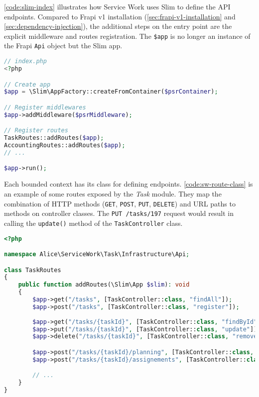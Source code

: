 \autoref{code:slim-index} illustrates how Service Work uses Slim to define the API endpoints. Compared to Frapi v1 installation (\autoref{sec:frapi-v1-installation} and \autoref{sec:dependency-injection}), the additional steps on the entry point are the explicit middleware and routes registration. The \texttt{\$app} is no longer an instance of the Frapi \texttt{Api} object but the Slim app.

\begin{lstlisting}[language=PHP,label={code:slim-index},caption={API entry point script without Frapi.}]
// index.php
<?php

// Create app
$app = \Slim\AppFactory::createFromContainer($psrContainer);

// Register middlewares
$app->addMiddleware($psrMiddleware);

// Register routes
TaskRoutes::addRoutes($app);
AccountingRoutes::addRoutes($app);
// ...

$app->run();
\end{lstlisting}

Each bounded context has its class for defining endpoints. \autoref{code:sw-route-class} is an example of some routes exposed by the \textit{Task} module. They map the combination of HTTP methods (\texttt{GET}, \texttt{POST}, \texttt{PUT}, \texttt{DELETE}) and URL paths to methods on controller classes. The \texttt{PUT /tasks/197} request would result in calling the \texttt{update()} method of the \texttt{TaskController} class.

\begin{lstlisting}[language=PHP,label={code:sw-route-class},caption={HTTP route definitions for the \texttt{Task} bounded context.}]
<?php

namespace Alice\ServiceWork\Task\Infrastructure\Api;

class TaskRoutes
{
	public function addRoutes(\Slim\App $slim): void
	{
		$app->get("/tasks", [TaskController::class, "findAll"]);
        $app->post("/tasks", [TaskController::class, "register"]);
        
        $app->get("/tasks/{taskId}", [TaskController::class, "findById"]);
        $app->put("/tasks/{taskId}", [TaskController::class, "update"]);
        $app->delete("/tasks/{taskId}", [TaskController::class, "remove"]);

		$app->post("/tasks/{taskId}/planning", [TaskController::class, "plan"]);
		$app->post("/tasks/{taskId}/assignements", [TaskController::class, "assign"]);

		// ...
	}
}
\end{lstlisting}

